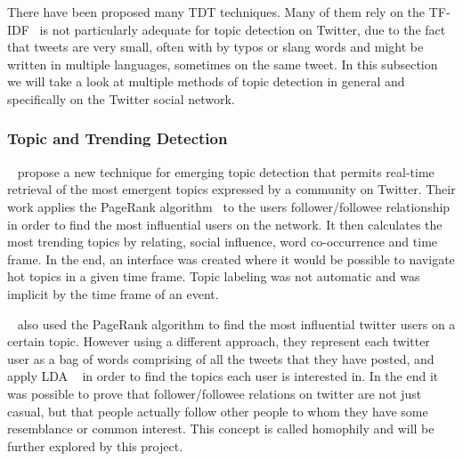 There have been proposed many \ac{TDT} techniques. Many of them rely on the \ac{TF-IDF}~\cite{Baeza-Yates:1999:MIR:553876} is not particularly adequate for topic detection on Twitter, due to the fact that tweets are very small, often with by typos or slang words and might be written in multiple languages, sometimes on the same tweet. In this subsection we will take a look at multiple methods of topic detection in general and specifically on the Twitter social network.

\subsubsection{Topic and Trending Detection} 
\label{sub:real_time_topic_and_trending_detection}
~\citet{Cataldi2010} propose a new technique for emerging topic detection that permits real-time retrieval of the most emergent topics expressed by a community on Twitter. Their work applies the PageRank algorithm~\cite{Pagerank1998} to the users follower/followee relationship in order to find the most influential users on the network. It then calculates the most trending topics by relating, social influence, word co-occurrence and time frame. In the end, an interface was created where it would be possible to navigate hot topics in a given time frame. Topic labeling was not automatic and was implicit by the time frame of an event.

~\citet{Weng2010} also used the PageRank algorithm to find the most influential twitter users on a certain topic. However using a different approach, they represent each twitter user as a bag of words comprising of all the tweets that they have posted, and apply \ac{LDA} ~\cite{Blei2003} in order to find the topics each user is interested in. In the end it was possible to prove that follower/followee relations on twitter are not just casual, but that people actually follow other people to whom they have some resemblance or common interest. This concept is called homophily and will be further explored by this project.

